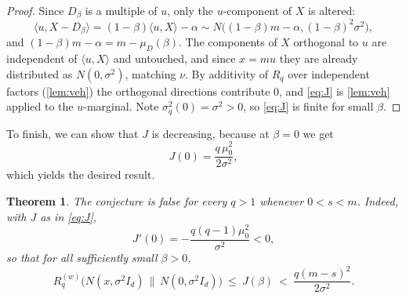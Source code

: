 \documentclass[11pt,reqno]{amsart}
\newtheorem{theorem}{Theorem}
\theoremstyle{definition}
\theoremstyle{remark}
\numberwithin{equation}{section}
\begin{document}
\begin{proof}
Since $D_\beta$ is a multiple of $u$, only the $u$-component of $X$ is altered:
$$\langle u,X-D_\beta\rangle=(1-\beta)\langle u,X\rangle-\alpha\sim N\big((1-\beta)m-\alpha,(1-\beta)^2\sigma^2\big),$$
and $(1-\beta)m-\alpha=m-\mu_D(\beta)$. The components of $X$ orthogonal to $u$ are independent of $\langle u,X\rangle$ and untouched, and since $x=mu$ they are already distributed as $N(0,\sigma^2)$, matching $\nu$. By additivity of $R_q$ over independent factors (\cref{lem:veh}) the orthogonal directions contribute $0$, and \eqref{eq:J} is \cref{lem:veh} applied to the $u$-marginal. Note $\sigma_q^2(0)=\sigma^2>0$, so \eqref{eq:J} is finite for small $\beta$.
\end{proof}

To finish, we can show that $J$ is decreasing, because at $\beta=0$ we get
\begin{equation}\label{eq:J0}
J(0)=\frac{q\,\mu_0^2}{2\sigma^2},
\end{equation}
which yields the desired result.

\begin{theorem}\label{thm:qbig}
The conjecture is false for every $q>1$ whenever $0<s<m$. Indeed, with $J$ as in \eqref{eq:J},
$$J'(0)=-\frac{q(q-1)\mu_0^2}{\sigma^2}<0,$$
so that for all sufficiently small $\beta>0$,
$$R^{(w)}_{q}\big(N(x,\sigma^2I_d)\,\big\|\,N(0,\sigma^2I_d)\big)\ \le\ J(\beta)\ <\ \frac{q(m-s)^2}{2\sigma^2}.$$
\end{theorem}
\end{document}
